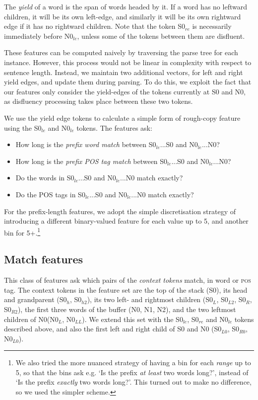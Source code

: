 \documentclass[11pt,letterpaper]{article}
\newcommand{\pos}{\textsc{pos}\xspace}
\newcommand{\szero}{S0\xspace}
\newcommand{\nzero}{N0\xspace}
\newcommand{\szeroH}{S0$_h$\xspace}
\newcommand{\szeroHH}{S0$_{h2}$\xspace}
\newcommand{\szeroL}{S0$_L$\xspace}
\newcommand{\szeroLL}{S0$_{L2}$\xspace}
\newcommand{\szeroR}{S0$_R$\xspace}
\newcommand{\szeroRR}{S0$_{R2}$\xspace}
\newcommand{\szeroLzero}{S0$_{L0}$\xspace}
\newcommand{\szeroRzero}{S0$_{R0}$\xspace}
\newcommand{\nzeroL}{N0$_L$\xspace}
\newcommand{\nzeroLL}{N0$_{LL}$\xspace}
\newcommand{\nzeroLzero}{N0$_{L0}$\xspace}
\newcommand{\szeroRedge}{S0$_{re}$\xspace}
\newcommand{\szeroLedge}{S0$_{le}$\xspace}
\newcommand{\nzeroLedge}{N0$_{le}$\xspace}
\begin{document}
The \emph{yield} of a word is the span of words headed by it.  If a word has
no leftward children, it will be its own left-edge, and similarly it will be
its own rightward edge if it has no rightward children. Note that the token
\szeroRedge is necessarily immediately before \nzeroLedge, unless some of the
tokens between them are disfluent.

These features can be computed naively by traversing the parse tree for each
instance. However, this process would not be linear in complexity with respect
to sentence length.  Instead, we maintain two additional vectors, for left
and right yield edges, and update them during parsing.  To do this, we exploit
the fact that our features only consider the yield-edges of the tokens currently
at S0 and N0, as disfluency processing takes place between these two tokens.

We use the yield edge tokens to calculate a simple form of rough-copy feature
using the \szeroLedge and \nzeroLedge tokens.  The features ask:

\begin{itemize}
    \itemsep0em
    \item How long is the \emph{prefix word match} between \szeroLedge...\szero
          and \nzeroLedge...\nzero?
    \item How long is the \emph{prefix POS tag match} between \szeroLedge...\szero
          and \nzeroLedge...\nzero?
    \item Do the words in \szeroLedge...\szero and \nzeroLedge...\nzero match
          exactly?
    \item Do the POS tags in \szeroLedge...\szero and \nzeroLedge...\nzero match
          exactly?
\end{itemize}

For the prefix-length features, we adopt the simple discretisation strategy of
introducing a different binary-valued feature for each value up to 5, and another
bin for 5+.\footnote{We also tried the more nuanced strategy of having a bin for each
\emph{range} up to 5, so that the bins ask e.g. `Is the prefix \emph{at
least} two words long?', instead of `Is the prefix \emph{exactly} two words long?'.
This turned out to make no difference, so we used the simpler scheme.}

\subsection{Match features}

This class of features ask which pairs of the \emph{context tokens} match, in
word or \pos tag.  The context tokens in the \citet{zhang:11} feature set
are the top of the stack (\szero), its head and grandparent (\szeroH, \szeroHH),
its two left- and rightmost children (\szeroL, \szeroLL, \szeroR, \szeroRR), the
first three words of the buffer (\nzero, N1, N2), and the two leftmost children
of \nzero (\nzeroL, \nzeroLL).
We extend this set with the \szeroLedge, \szeroRedge and \nzeroLedge tokens
described above, and also the first left and right child of \szero and \nzero
(\szeroLzero, \szeroRzero, \nzeroLzero).
\end{document}
